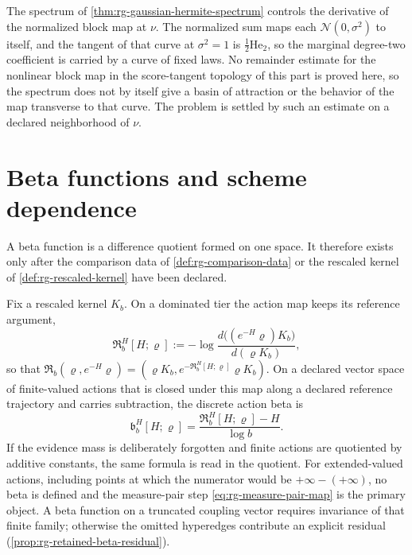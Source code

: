 The spectrum of \cref{thm:rg-gaussian-hermite-spectrum} controls the
derivative of the normalized block map at \(\nu\). The normalized sum maps
each \(\mathcal N(0,\sigma^2)\) to itself, and the tangent of that curve at
\(\sigma^2=1\) is \(\tfrac12\mathrm{He}_2\), so the marginal degree-two
coefficient is carried by a curve of fixed laws. No remainder estimate for the
nonlinear block map in the score-tangent topology of this part is proved here,
so the spectrum does not by itself give a basin of attraction or the behavior
of the map transverse to that curve. The problem is settled by such an
estimate on a declared neighborhood of \(\nu\).

\section{Beta functions and scheme dependence}
\label{sec:rg-beta-function}

A beta function is a difference quotient formed on one space. It therefore
exists only after the comparison data of \cref{def:rg-comparison-data} or the
rescaled kernel of \cref{def:rg-rescaled-kernel} have been declared.

Fix a rescaled kernel \(K_b\). On a dominated tier the action map keeps its
reference argument,
\begin{equation}
\mathfrak R^H_b[H;\varrho]
:=-\log\frac{d\bigl((e^{-H}\varrho)K_b\bigr)}{d(\varrho K_b)},
\label{eq:rg-reference-dependent-action-map}
\end{equation}
so that
\(\mathfrak R_b(\varrho,e^{-H}\varrho)=(\varrho K_b,e^{-\mathfrak R^H_b[H;\varrho]}\varrho K_b)\).
On a declared vector space of finite-valued actions that is closed under this
map along a declared reference trajectory and carries subtraction, the
discrete action beta is
\begin{equation}
\mathfrak b^H_b[H;\varrho]
=\frac{\mathfrak R^H_b[H;\varrho]-H}{\log b}.
\label{eq:rg-discrete-beta-functional}
\end{equation}
If the evidence mass is deliberately forgotten and finite actions are
quotiented by additive constants, the same formula is read in the quotient.
For extended-valued actions, including points at which the numerator would be
\(+\infty-(+\infty)\), no beta is defined and the measure-pair step
\eqref{eq:rg-measure-pair-map} is the primary object. A beta function on a
truncated coupling vector requires invariance of that finite family; otherwise
the omitted hyperedges contribute an explicit residual
(\cref{prop:rg-retained-beta-residual}).

